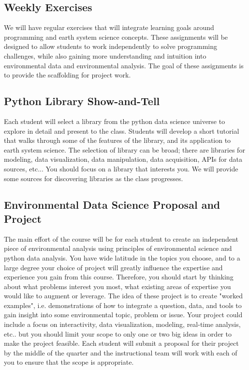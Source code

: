 \documentclass[12pt]{report}
\begin{document}
\subsection{Weekly Exercises}

We will have regular exercises that will integrate learning goals around programming and earth system science concepts. These assignments will be designed to allow students to work independently to solve programming challenges, while also gaining more understanding and intuition into environmental data and environmental analysis. The goal of these assignments is to provide the scaffolding for project work.

\subsection{Python Library Show-and-Tell}

Each student will select a library from the python data science universe to explore in detail and present to the class. Students will develop a short tutorial that walks through some of the features of the library, and its application to earth system science. The selection of library can be broad; there are libraries for modeling, data visualization, data manipulation, data acquisition, APIs for data sources, etc... You should focus on a library that interests you. We will provide some sources for discovering libraries as the class progresses.


\subsection{Environmental Data Science Proposal and Project}

The main effort of the course will be for each student to create an independent piece of environmental analysis using principles of environmental science and python data analysis. You have wide latitude in the topics you choose, and to a large degree your choice of project will greatly influence the expertise and experience you gain from this course. Therefore, you should start by thinking about what problems interest you most, what existing areas of expertise you would like to augment or leverage. The idea of these project is to create "worked examples", i.e. demonstrations of how to integrate a question, data, and tools to gain insight into some environmental topic, problem or issue. Your project could include a focus on interactivity, data visualization, modeling, real-time analysis, etc.. but you should limit your scope to only one or two big ideas in order to make the project feasible. Each student will submit a proposal for their project by the middle of the quarter and the instructional team will work with each of you to ensure that the scope is appropriate. 
\end{document}
